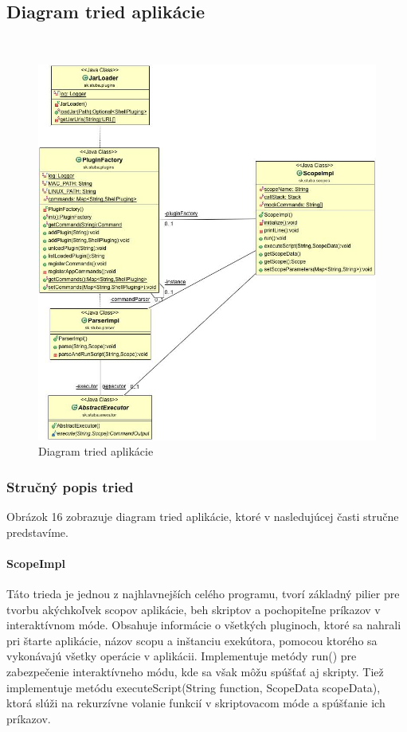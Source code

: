 \newpage
\subsection{Diagram tried aplikácie}
 \begin{figure}[!htbp]
	\centering
	\includegraphics[scale=0.4]{img/ClassApplication.jpg}
	\caption{Diagram tried aplikácie}
	\label{fig:test}
\end{figure}
\subsubsection{Stručný popis tried}
\indent Obrázok 16 zobrazuje diagram tried aplikácie, ktoré v nasledujúcej časti stručne predstavíme.
\paragraph{ScopeImpl}
Táto trieda je jednou z najhlavnejších celého programu, tvorí základný pilier pre tvorbu akýchkoľvek scopov aplikácie, beh skriptov a pochopiteľne príkazov v interaktívnom móde. Obsahuje informácie o všetkých pluginoch, ktoré sa nahrali pri štarte aplikácie, názov scopu a inštanciu exekútora, pomocou ktorého sa vykonávajú všetky operácie v aplikácii. Implementuje metódy run() pre zabezpečenie interaktívneho módu, kde sa však môžu spúšťať aj skripty. Tiež implementuje metódu executeScript(String function, ScopeData scopeData), ktorá slúži na rekurzívne volanie funkcií v skriptovacom móde a  spúšťanie ich príkazov.
